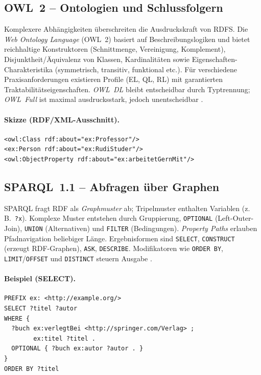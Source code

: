 \subsection{OWL~2 -- Ontologien und Schlussfolgern}
\label{subsec:owl}

Komplexere Abhängigkeiten überschreiten die Ausdruckskraft von RDFS. Die \emph{Web Ontology Language} (OWL~2) basiert auf Beschreibungslogiken und bietet reichhaltige Konstruktoren (Schnittmenge, Vereinigung, Komplement), Disjunktheit/Äquivalenz von Klassen, Kardinalitäten sowie Eigenschaften-Charakteristika (symmetrisch, transitiv, funktional etc.). Für verschiedene Praxisanforderungen existieren Profile (EL, QL, RL) mit garantierten Traktabilitätseigenschaften. \emph{OWL~DL} bleibt entscheidbar durch Typtrennung; \emph{OWL~Full} ist maximal ausdrucksstark, jedoch unentscheidbar \cite{Hitzler,AntoniouVanHarmelen,OWL2Overview}.

\paragraph{Skizze (RDF/XML-Ausschnitt).}
\begin{lstlisting}
<owl:Class rdf:about="ex:Professor"/>
<ex:Person rdf:about="ex:RudiStuder"/>
<owl:ObjectProperty rdf:about="ex:arbeitetGernMit"/>
\end{lstlisting}

\subsection{SPARQL~1.1 -- Abfragen über Graphen}
\label{subsec:sparql}

SPARQL fragt RDF als \emph{Graphmuster} ab; Tripelmuster enthalten Variablen (z.\,B.\ \texttt{?x}). Komplexe Muster entstehen durch Gruppierung, \texttt{OPTIONAL} (Left-Outer-Join), \texttt{UNION} (Alternativen) und \texttt{FILTER} (Bedingungen). \emph{Property Paths} erlauben Pfadnavigation beliebiger Länge. Ergebnisformen sind \texttt{SELECT}, \texttt{CONSTRUCT} (erzeugt RDF-Graphen), \texttt{ASK}, \texttt{DESCRIBE}. Modifikatoren wie \texttt{ORDER BY}, \texttt{LIMIT}/\texttt{OFFSET} und \texttt{DISTINCT} steuern Ausgabe \cite{SPARQL11Overview,Hitzler,AntoniouVanHarmelen}.

\paragraph{Beispiel (SELECT).}
\begin{lstlisting}
PREFIX ex: <http://example.org/>
SELECT ?titel ?autor
WHERE {
  ?buch ex:verlegtBei <http://springer.com/Verlag> ;
        ex:titel ?titel .
  OPTIONAL { ?buch ex:autor ?autor . }
}
ORDER BY ?titel
\end{lstlisting}

